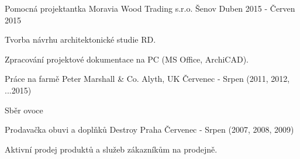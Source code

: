 \vspace{2pt}


\begin{cventries}

    \cventry
    {Pomocná projektantka} %
    {Moravia Wood Trading s.r.o.} %
    {Šenov} %
    {Duben 2015 - Červen 2015} %
    {
      \begin{cvitems} %
        \item {Tvorba návrhu architektonické studie RD.}
        \item {Zpracování projektové dokumentace na PC (MS Office, ArchiCAD).}
      \end{cvitems}
    }
   
    \cventry
    {Práce na farmě}
    {Peter Marshall \& Co.}
    {Alyth, UK}
    {Červenec - Srpen (2011, 2012, ...2015)}
    {
    \begin{cvitems}
      \item {Sběr ovoce}
    \end{cvitems}
    }
   
    \cventry
    {Prodavačka obuvi a doplňků}
    {Destroy}
    {Praha}
    {Červenec - Srpen (2007, 2008, 2009)}
    {
    \begin{cvitems}
      \item {Aktivní prodej produktů a služeb zákazníkům na prodejně.}
    \end{cvitems}
    }
  

\end{cventries}
